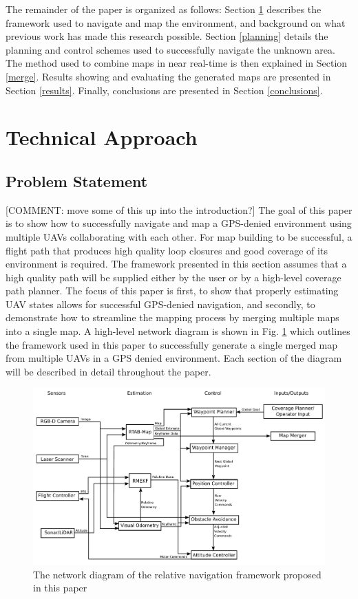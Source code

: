 \documentclass[letterpaper, 10 pt, conference]{ieeeconf}  %
\newcommand{\comment}[1]{{\color{red}[COMMENT: #1]}}
\begin{document}
The remainder of the paper is organized as follows: Section \ref{approach} describes the framework used to navigate and map the environment, and background on what previous work has made this research possible. Section \ref{planning} details the planning and control schemes used to successfully navigate the unknown area. The method used to combine maps in near real-time is then explained in Section \ref{merge}. Results showing and evaluating the generated maps are presented in Section \ref{results}. Finally, conclusions are presented in Section \ref{conclusions}.

\section{Technical Approach}\label{approach}

\subsection{Problem Statement}

\comment{move some of this up into the introduction?}
The goal of this paper is to show how to successfully navigate and map a GPS-denied environment using multiple UAVs collaborating with each other. For map building to be successful, a flight path that produces high quality loop closures and good coverage of its environment is required. The framework presented in this section assumes that a high quality path will be supplied either by the user or by a high-level coverage path planner. The focus of this paper is first, to show that properly estimating UAV states allows for successful GPS-denied navigation, and secondly, to demonstrate how to streamline the mapping process by merging multiple maps into a single map. A high-level network diagram is shown in Fig. \ref{fig:rtab_network} which outlines the framework used in this paper to successfully generate a single merged map from multiple UAVs in a GPS denied environment. Each section of the diagram will be described in detail throughout the paper.

\begin{figure}
\centering
\includegraphics[width=1.0\linewidth]{rtab_relative_nav_network}
\caption{The network diagram of the relative navigation framework proposed in this paper}
\label{fig:rtab_network}
\end{figure}
\end{document}
